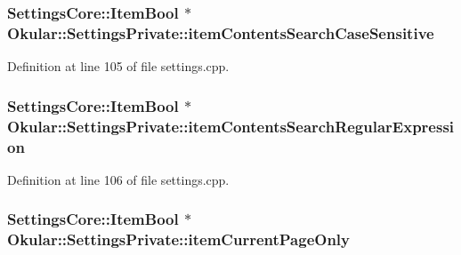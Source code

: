 \hypertarget{classOkular_1_1SettingsPrivate_a31bdbcadec0d77d5f5ce1083d8d70232}{
\subsubsection[{item\+Contents\+Search\+Case\+Sensitive}]{\setlength{\rightskip}{0pt plus 5cm}Settings\+Core\+::\+Item\+Bool $\ast$ Okular\+::\+Settings\+Private\+::item\+Contents\+Search\+Case\+Sensitive}}\label{classOkular_1_1SettingsPrivate_a31bdbcadec0d77d5f5ce1083d8d70232}


Definition at line 105 of file settings.\+cpp.

\hypertarget{classOkular_1_1SettingsPrivate_a220f3128585d9da070425c49a650d9e1}{
\subsubsection[{item\+Contents\+Search\+Regular\+Expression}]{\setlength{\rightskip}{0pt plus 5cm}Settings\+Core\+::\+Item\+Bool $\ast$ Okular\+::\+Settings\+Private\+::item\+Contents\+Search\+Regular\+Expression}}\label{classOkular_1_1SettingsPrivate_a220f3128585d9da070425c49a650d9e1}


Definition at line 106 of file settings.\+cpp.

\hypertarget{classOkular_1_1SettingsPrivate_ad0d5cbc1d3c00e0f1008fa7cf5248f5b}{
\subsubsection[{item\+Current\+Page\+Only}]{\setlength{\rightskip}{0pt plus 5cm}Settings\+Core\+::\+Item\+Bool $\ast$ Okular\+::\+Settings\+Private\+::item\+Current\+Page\+Only}}\label{classOkular_1_1SettingsPrivate_ad0d5cbc1d3c00e0f1008fa7cf5248f5b}


